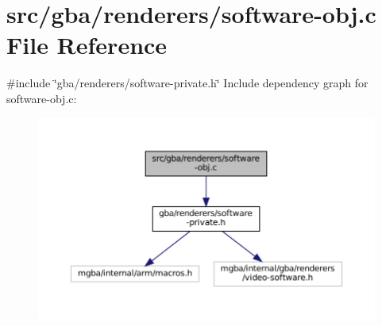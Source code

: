 \hypertarget{software-obj_8c}{}\section{src/gba/renderers/software-\/obj.c File Reference}
\label{software-obj_8c}
{\ttfamily \#include \char`\"{}gba/renderers/software-\/private.\+h\char`\"{}}\newline
Include dependency graph for software-\/obj.c\+:
\nopagebreak
\begin{figure}[H]
\begin{center}
\leavevmode
\includegraphics[width=350pt]{software-obj_8c__incl}
\end{center}
\end{figure}
